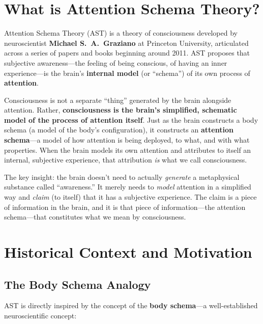 \documentclass[11pt,a4paper]{report}
\begin{document}
\section{What is Attention Schema Theory?}

Attention Schema Theory (AST) is a theory of consciousness developed by neuroscientist \textbf{Michael S.\ A.\ Graziano} at Princeton University, articulated across a series of papers and books beginning around 2011. AST proposes that subjective awareness---the feeling of being conscious, of having an inner experience---is the brain's \textbf{internal model} (or ``schema'') of its own process of \textbf{attention}.

\begin{definitionbox}
Consciousness is not a separate ``thing'' generated by the brain alongside attention. Rather, \textbf{consciousness is the brain's simplified, schematic model of the process of attention itself}. Just as the brain constructs a body schema (a model of the body's configuration), it constructs an \textbf{attention schema}---a model of how attention is being deployed, to what, and with what properties. When the brain models its own attention and attributes to itself an internal, subjective experience, that attribution \emph{is} what we call consciousness.
\end{definitionbox}

The key insight: the brain doesn't need to actually \emph{generate} a metaphysical substance called ``awareness.'' It merely needs to \emph{model} attention in a simplified way and \emph{claim} (to itself) that it has a subjective experience. The claim is a piece of information in the brain, and it is that piece of information---the attention schema---that constitutes what we mean by consciousness.

\section{Historical Context and Motivation}

\subsection{The Body Schema Analogy}

AST is directly inspired by the concept of the \textbf{body schema}---a well-established neuroscientific concept:
\end{document}
